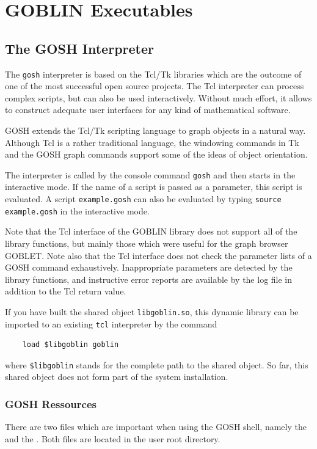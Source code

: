 \documentclass[a4paper,11pt,twoside]{book}
\begin{document}
\part{GOBLIN Executables}
\begin{multicols}{2}

\chapter{The GOSH Interpreter}
\thispagestyle{fancy}
\label{clb_gosh}
The \verb/gosh/ interpreter is based on the Tcl/Tk libraries which are the
outcome of one of the most successful open source projects.
The Tcl interpreter can process complex scripts, but can also be used
interactively. Without much effort, it allows to construct adequate user
interfaces for any kind of mathematical software.

GOSH extends the Tcl/Tk scripting language to graph objects in a natural way.
Although Tcl is a rather traditional language, the windowing commands in Tk and
the GOSH graph commands support some of the ideas of object orientation.

The interpreter is called by the console command \verb/gosh/ and then
starts in the interactive mode. If the name of a script is passed as a
parameter, this script is evaluated. A script \verb/example.gosh/ can also be
evaluated by typing \verb/source example.gosh/ in the interactive mode.

Note that the Tcl interface of the GOBLIN library does not support all of the
library functions, but mainly those which were useful for the graph browser
GOBLET. Note also that the Tcl interface does not check the parameter lists
of a GOSH command exhaustively. Inappropriate parameters are detected by the
library functions, and instructive error reports are available by the log file
in addition to the Tcl return value.

If you have built the shared object \verb/libgoblin.so/, this dynamic library
can be imported to an existing \verb/tcl/ interpreter by the command
\begin{verbatim}
    load $libgoblin goblin
\end{verbatim}
where \verb/$libgoblin/ stands for the complete path to the shared object. So
far, this shared object does not form part of the system installation.


\section{GOSH Ressources}
\label{slb_gosh_ressources}
There are two files which are important when using the GOSH shell, namely the
 and the . Both files are located in the
user root directory.


\end{multicols}
\end{document}
